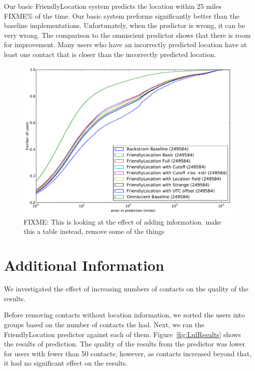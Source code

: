 Our basic FriendlyLocation system predicts the location within 25 miles FIXME\% of
the time.
%
Our basic system preforms significantly better than the baseline implementations.
%
Unfortunately, when the predictor is wrong, it can be very wrong.
%
The comparison to the omniscient predictor shows that there is room for improvement.
%
Many users who have an incorrectly predicted location have at least one contact
that is closer than the incorrectly predicted location.


\begin{figure}[tb]
\centering
\includegraphics[width=\linewidth]{figures/fl_parts.pdf}
\caption{
    FIXME: This is looking at the effect of adding information. make this a table instead, remove some of the things
}
\label{fig:NearProbFit}
\end{figure}

\section{Additional Information}
We investigated the effect of increasing numbers of contacts on the quality of
the results.

Before removing contacts without location information, we sorted the users into
groups based on the number of contacts the had.
Next, we ran the FriendlyLocation predictor against each of them.
Figure~\ref{fig:LulResults} shows the results of prediction.
The quality of the results from the predictor was lower for users with fewer
than 50 contacts; however, as contacts increased beyond that, it had no
significant effect on the results.

